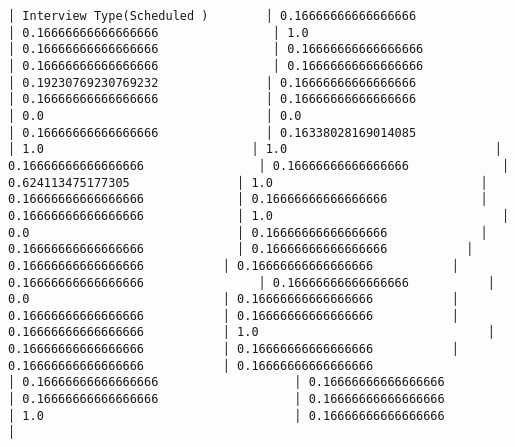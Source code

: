 \documentclass[11pt]{article}
\begin{document}
\begin{Verbatim}[commandchars=\\\{\}]
│ Interview Type(Scheduled )        │ 0.16666666666666666                │ 0.16666666666666666                │ 1.0                                │ 0.16666666666666666                │ 0.16666666666666666                │ 0.16666666666666666                │ 0.16666666666666666                │ 0.19230769230769232               │ 0.16666666666666666               │ 0.16666666666666666               │ 0.16666666666666666                │ 0.0                               │ 0.0                               │ 0.16666666666666666               │ 0.16338028169014085             │ 1.0                             │ 1.0                             │ 0.16666666666666666                │ 0.16666666666666666             │ 0.624113475177305               │ 1.0                             │ 0.16666666666666666             │ 0.16666666666666666             │ 0.16666666666666666             │ 1.0                                │ 0.0                             │ 0.16666666666666666             │ 0.16666666666666666             │ 0.16666666666666666           │ 0.16666666666666666           │ 0.16666666666666666           │ 0.16666666666666666                │ 0.16666666666666666           │ 0.0                           │ 0.16666666666666666           │ 0.16666666666666666           │ 0.16666666666666666           │ 0.16666666666666666           │ 1.0                                │ 0.16666666666666666           │ 0.16666666666666666           │ 0.16666666666666666           │ 0.16666666666666666                   │ 0.16666666666666666                   │ 0.16666666666666666                   │ 0.16666666666666666                   │ 0.16666666666666666                   │ 1.0                                   │ 0.16666666666666666                   │

\end{Verbatim}
\end{document}

